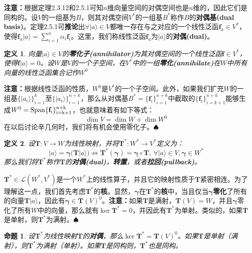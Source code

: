 \documentclass[mathserif,hyperref,UTF8,openany,b5paper]{ctexbook}
\newtheorem{defn}{定义}[section]
\newtheorem{pro}{命题}[section]
\begin{document}
\textbf{注意：}根据定理2.3.12和2.5.1可知$n$维向量空间的对偶空间也是$n$维的，因此它们是同构的。设$V$的一组基为$B$，则其对偶空间$V^*$的一组基$B^*$称作$B$的\textbf{对偶基(dual basis)}。定理2.5.1可\textbf{推论}出$\forall |a\rangle \in V$都唯一存在与之对应的一个线性泛函$\mathbf{f}_a\in V^*$，使得$\mathbf{f}_a|a\rangle=\sum^n_{i=1}\alpha_i\mathbf{f}_i$。这里，我们称线性泛函$\mathbf{f}_a$为$|a\rangle$的\textbf{对偶(dual)}。
\begin{defn}
向量$|a\rangle \in V$的\textbf{零化子(annihilator)}为其对偶空间的一个线性泛函$\mathbf{f}\in V^*$，使得$\mathbf{f}|a\rangle=0$。设$W$是$V$的一个子空间，在$V^*$中的一组\textbf{零化(annihilate)}在$W$中所有向量的线性泛函集合记作$W^0$
\end{defn}
\textbf{注意：}根据线性泛函的性质，$W^0$是$V^*$的一个子空间。此外，如果我们扩充$W$的一组基$\{|a_i\rangle\}^k_{i=1}$至$\{|a_i\rangle\}^{n+k}_{i=1}$，那么从对偶基$B^*=\{\mathbf{f}_i\}^{n+k}_{i=1}$中截取的$\{\mathbf{f}_i\}^{n+k}_{i=k+1}$能够生成$W^0=\rm{Span}\{\mathbf{f}_i\}^{n+k}_{i=k+1}$，也就意味着有如下等式：
\begin{equation}
\dim V = \dim W +\dim W^0
\end{equation}
在以后讨论辛几何时，我们将有机会使用零化子。$\spadesuit$
\begin{defn}
设$\mathbf{T}:V\xrightarrow{} W$为线性映射，并将$\mathbf{T}^*:W^*\xrightarrow{} V^*$定义为：
\begin{equation}
    [\mathbf{T}^*(\boldsymbol{\gamma})]|a\rangle = \boldsymbol{\gamma}(\mathbf{T}|a\rangle)\Leftrightarrow \mathbf{T}^*(\boldsymbol{\gamma}) = \boldsymbol{\gamma}\circ\mathbf{T}, \ \forall |a\rangle\in V, \boldsymbol{\gamma}\in W^*
\end{equation}
那么我们将$\mathbf{T}^*$称作$\mathbf{T}$的\textbf{对偶(dual)}，\textbf{转置}，或者\textbf{拉回(pullback)}。
\end{defn}

$\mathbf{T}^*\in\mathcal{L}(W^*,V^*)$是一个$W^*$上的线性算子，并且它的映射性质于$\mathbf{T}$紧密相连。为了理解这一点，我们首先考虑$\mathbf{T}^*$的\textbf{核}。显然，$\boldsymbol{\gamma}$在$\mathbf{T}^*$的\textbf{核}中，当且仅当$\boldsymbol{\gamma}$\textbf{零化}了所有的向量$\mathbf{T}|a\rangle$，因此有$\boldsymbol{\gamma}\in\mathbf{T}(V)^0$。\textbf{注意：}如果$\mathbf{T}$是满射，\(\mathbf{T}(V)=W\)，并且$\boldsymbol{\gamma}$零化了所有$W$中的向量，那么就有$\ker \mathbf{T}^*=0$，并因此有$\mathbf{T}^*$为单射。类似的，如果$\mathbf{T}$是单射，则$\mathbf{T}^*$为满射。$\spadesuit$ 
\begin{pro}
设$\mathbf{T}^*$为线性映射$\mathbf{T}$的\textbf{对偶}，那么$\ker \mathbf{T}^*=\mathbf{T}(V)^0$。如果$\mathbf{T}$是单射（满射），则$\mathbf{T}^*$为满射（单射）。如果$\mathbf{T}$是同构则，$\mathbf{T}^*$也是同构。
\end{pro}
\end{document}
